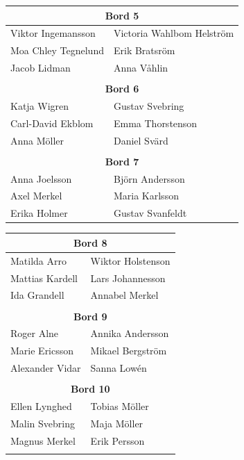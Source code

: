 \documentclass[a5paper]{article}
\begin{document}
\begin{landscape}
\begin{center}
\begin{tabular}{  l  l }
			\multicolumn{2}{c}{\textbf{Bord 5}} 				\\ \hline
			Viktor Ingemansson	&	Victoria Wahlbom Helström	\\
			Moa Chley Tegnelund	&	Erik Bratsröm				\\ 
			Jacob Lidman	&	Anna Våhlin						\\ 
			& \\  
			
			\multicolumn{2}{c}{\textbf{Bord 6}} 		\\ \hline
			Katja Wigren	&	Gustav Svebring			\\
			Carl-David Ekblom	&	Emma Thorstenson	\\ 
			Anna Möller	&	Daniel Svärd				\\ 
			\\
			\multicolumn{2}{c}{\textbf{Bord 7}} 				\\ \hline
			Anna Joelsson	&	Björn Andersson	\\
			Axel Merkel		&	Maria Karlsson	\\ 
			Erika Holmer	&	Gustav Svanfeldt	\\ 
			
			
		\end{tabular}
		\quad \hspace*{2cm}
		\begin{tabular}{  l  l }
				\multicolumn{2}{c}{\textbf{Bord 8}} 				\\ \hline
				Matilda Arro	&	Wiktor Holstenson	\\
				Mattias Kardell	&	Lars Johannesson	\\ 
				Ida Grandell	&	Annabel Merkel	\\ 
				&										\\ 
				
				\multicolumn{2}{c}{\textbf{Bord 9}} 				\\ \hline
				Roger Alne	&	Annika Andersson	\\
				Marie Ericsson	&	Mikael Bergström	\\ 
				Alexander Vidar	&	Sanna Lowén	\\
				&										\\ 
				
				\multicolumn{2}{c}{\textbf{Bord 10}} 				\\ \hline
				Ellen Lynghed	&	Tobias Möller	\\
				Malin Svebring	&	Maja Möller	\\ 
				Magnus Merkel	&	Erik Persson	\\ 
				&										\\ 
				

\end{tabular}
\end{center}
\end{landscape}
\end{document}
